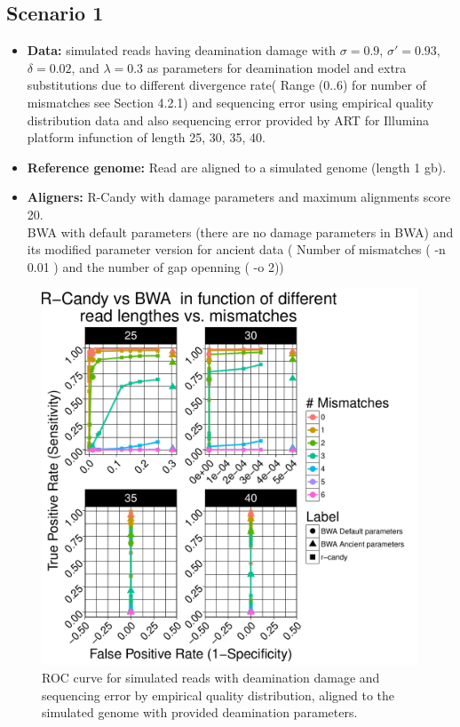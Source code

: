 \documentclass[11pt,a4paper]{report}
\begin{document}
\subsection{Scenario 1 }
\begin{itemize}
   \item \textbf{Data:} simulated reads having deamination damage with $ \sigma = 0.9$, 
$ \sigma\prime = 0.93 $, $\delta = 0.02 $,  and $\lambda = 0.3 $ as parameters for 
deamination model and extra substitutions due to different divergence rate( Range 
(0..6) for number of mismatches see Section 4.2.1) and sequencing error using 
empirical quality distribution data and also sequencing error provided by ART 
for Illumina platform infunction of length 25, 30, 35, 40.
  \item \textbf{Reference genome:}  Read are aligned to a simulated genome (length 1 gb).
  \item \textbf{Aligners:} R-Candy with damage parameters and maximum alignments score 20. \\
BWA with default parameters (there are no damage parameters in BWA) and its 
modified parameter version for ancient data ( Number of mismatches ( -n 0.01 ) 
and the number of gap openning ( -o 2))

  \end{itemize}

\begin{figure}[H]
\centering
\includegraphics[width=12cm]{pictures/bROC_DS1_emp.pdf}
\caption{ROC curve for simulated reads with deamination damage and sequencing 
error by empirical quality distribution, aligned to the simulated genome
with provided deamination parameters.}
\label{DS1_emp}
\end{figure}
\end{document}
